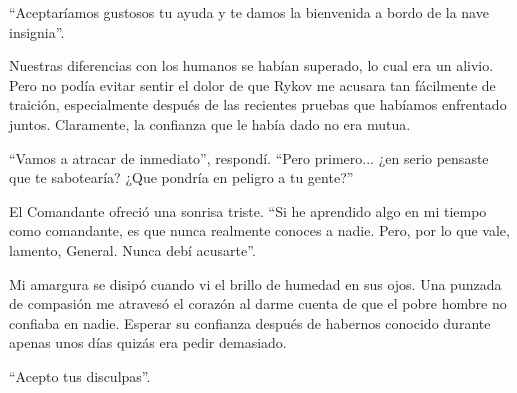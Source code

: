 ``Aceptaríamos gustosos tu ayuda y te damos la bienvenida a bordo de la nave insignia''.

Nuestras diferencias con los humanos se habían superado, lo cual era un alivio. Pero no podía evitar sentir el dolor de que Rykov me acusara tan fácilmente de traición, especialmente después de las recientes pruebas que habíamos enfrentado juntos. Claramente, la confianza que le había dado no era mutua.

``Vamos a atracar de inmediato'', respondí. ``Pero primero... ¿en serio pensaste que te sabotearía? ¿Que pondría en peligro a tu gente?''

El Comandante ofreció una sonrisa triste. ``Si he aprendido algo en mi tiempo como comandante, es que nunca realmente conoces a nadie. Pero, por lo que vale, lamento, General. Nunca debí acusarte''.

Mi amargura se disipó cuando vi el brillo de humedad en sus ojos. Una punzada de compasión me atravesó el corazón al darme cuenta de que el pobre hombre no confiaba en nadie. Esperar su confianza después de habernos conocido durante apenas unos días quizás era pedir demasiado.

``Acepto tus disculpas''.